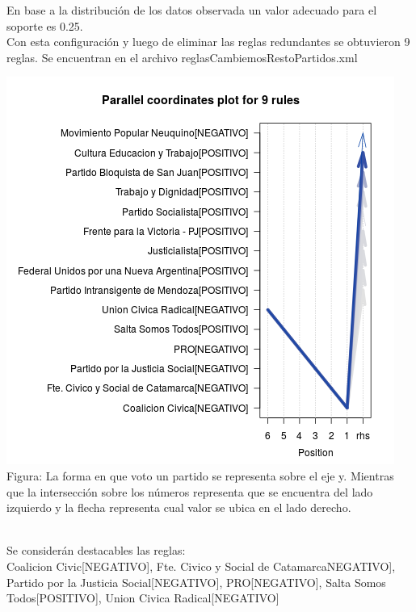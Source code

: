 \documentclass{endm}
\begin{document}
En base a la distribución de los datos observada un valor adecuado para el soporte es 0.25. \\

Con esta configuración y luego de eliminar las reglas redundantes se obtuvieron 9 reglas. Se encuentran en el archivo reglasCambiemosRestoPartidos.xml  \\

\begin{center}
\includegraphics[scale=0.4]{graficos/paracoordCambiemosRestoPartidos.png} \\
\scriptsize{Figura: La forma en que voto un partido se representa sobre el eje y. Mientras que la intersección sobre  los números representa que se encuentra del lado izquierdo y la flecha representa cual valor se ubica en el lado derecho.}
\end{center} \\

Se considerán destacables las reglas: \\

{Coalicion Civic[NEGATIVO],    
Fte. Civico y Social de CatamarcaNEGATIVO],     
Partido por la Justicia Social[NEGATIVO],
PRO[NEGATIVO],      
Salta Somos Todos[POSITIVO],
Union Civica Radical[NEGATIVO]}               \\
\end{document}
